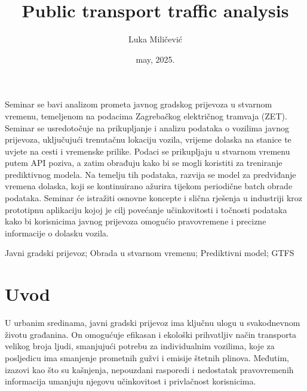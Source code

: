 \documentclass[seminarskirad]{fer}
\title{Public transport traffic analysis}
\author{Luka Miličević}
\date{may, 2025.}
\begin{document}


\maketitle


\mainmatter



\begin{sazetak}
  Seminar se bavi analizom prometa javnog gradskog prijevoza u stvarnom vremenu, temeljenom na podacima Zagrebačkog električnog tramvaja (ZET). Seminar se usredotočuje na prikupljanje i analizu podataka o vozilima javnog prijevoza, uključujući trenutačnu lokaciju vozila, vrijeme dolaska na stanice te uvjete na cesti i vremenske prilike. Podaci se prikupljaju u stvarnom vremenu putem API poziva, a zatim obrađuju kako bi se mogli koristiti za treniranje prediktivnog modela. Na temelju tih podataka, razvija se model za predviđanje vremena dolaska, koji se kontinuirano ažurira tijekom periodične batch obrade podataka. Seminar će istražiti osnovne koncepte i slična rješenja u industriji kroz prototipnu aplikaciju kojoj je cilj povećanje učinkovitosti i točnosti podataka kako bi korisnicima javnog prijevoza omogućio pravovremene i precizne informacije o dolasku vozila. 
\end{sazetak}

\begin{kljucnerijeci}
  Javni gradski prijevoz; Obrada u stvarnom vremenu; Prediktivni model; GTFS
\end{kljucnerijeci}


\tableofcontents


\chapter{Uvod}
\label{pog:uvod}

U urbanim sredinama, javni gradski prijevoz ima ključnu ulogu u svakodnevnom životu građanina. On omogućuje efikasan i ekološki prihvatljiv način transporta velikog broja ljudi, smanjujući potrebu za individualnim vozilima, koje za posljedicu ima smanjenje prometnih gužvi i emisije štetnih plinova. Međutim, izazovi kao što su kašnjenja, nepouzdani rasporedi i nedostatak pravovremenih informacija umanjuju njegovu učinkovitost i privlačnost korisnicima.
\end{document}
